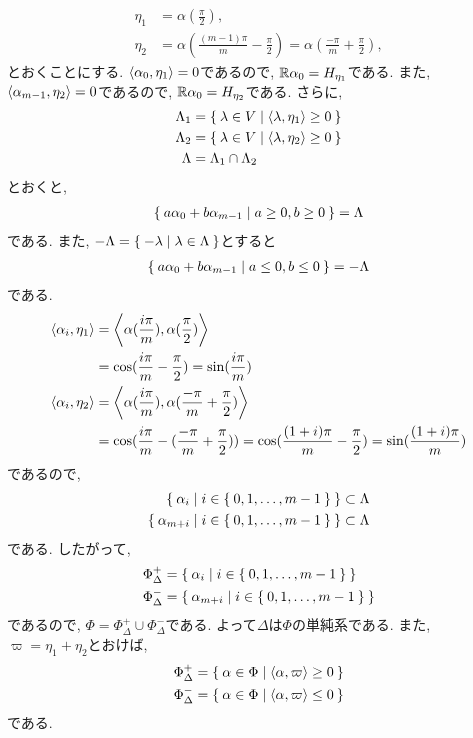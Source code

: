 \begin{align*}
  \eta_1&=\alpha(\frac{\pi}{2}),\\
  \eta_2&=\alpha(\frac{(m-1)\pi}{m}-\frac{\pi}{2})=\alpha(\frac{-\pi}{m}+\frac{\pi}{2}),
\end{align*}
とおくことにする.
$\Braket{\alpha_0, \eta_1} = 0$であるので, $\mathbb{R}\alpha_0=H_{\eta_1}$である.
また, 
$\Braket{\alpha_{m-1}, \eta_2} = 0$であるので, $\mathbb{R}\alpha_0=H_{\eta_2}$である.
さらに,
\begin{align*}
 \Lambda_1&= \Set{\lambda\in V|\Braket{\lambda,\eta_1}\geq 0}\\
 \Lambda_2&= \Set{\lambda\in V|\Braket{\lambda,\eta_2}\geq 0}\\
 \Lambda&=\Lambda_1\cap \Lambda_2
\end{align*}
とおくと,
\begin{align*}
  \Set{a\alpha_0+b\alpha_{m-1}|a\geq 0,b\geq 0}=\Lambda
\end{align*}
である. また, $-\Lambda=\Set{-\lambda|\lambda\in\Lambda}$とすると
\begin{align*}
  \Set{a\alpha_0+b\alpha_{m-1}|a\leq 0,b\leq 0}=-\Lambda
\end{align*}
である.
\begin{align*}
  \Braket{\alpha_i,\eta_1}&=\Braket{\alpha(\frac{i\pi}{m}),\alpha(\frac{\pi}{2})}\\
  &=\cos(\frac{i\pi}{m}-\frac{\pi}{2})=\sin(\frac{i\pi}{m})\\
\Braket{\alpha_i,\eta_2}&=\Braket{\alpha(\frac{i\pi}{m}),\alpha(\frac{-\pi}{m}+\frac{\pi}{2})}\\
&=\cos(\frac{i\pi}{m}-(\frac{-\pi}{m}+\frac{\pi}{2}))
=\cos(\frac{(1+i)\pi}{m}-\frac{\pi}{2})
=\sin(\frac{(1+i)\pi}{m})
\end{align*}
であるので,
\begin{align*}
\Set{\alpha_{i}|i\in\Set{0,1,\ldots,m-1}}\subset\Lambda\\
\Set{\alpha_{m+i}|i\in\Set{0,1,\ldots,m-1}}\subset\Lambda
\end{align*}
である.  したがって,
\begin{align*}
\Phi_\Delta^+&=\Set{\alpha_{i}|i\in\Set{0,1,\ldots,m-1}}\\
\Phi_\Delta^-&=\Set{\alpha_{m+i}|i\in\Set{0,1,\ldots,m-1}}
\end{align*}
であるので, $\Phi=\Phi_\Delta^+\cup\Phi_\Delta^-$である.
よって$\Delta$は$\Phi$の単純系である.
また,
$\varpi=\eta_1+\eta_2$とおけば,
\begin{align*}
\Phi_\Delta^+&=\Set{\alpha\in\Phi|\Braket{\alpha,\varpi}\geq 0}\\
\Phi_\Delta^-&=\Set{\alpha\in\Phi|\Braket{\alpha,\varpi}\leq 0}
\end{align*}
である.
